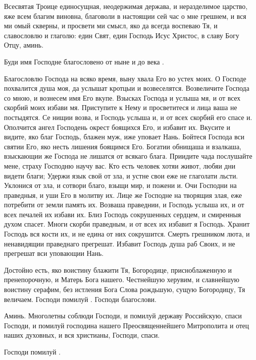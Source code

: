\begin{mymulticols}
 Всесвятая Троице единосущная, неодержимая держава, и неразделимое царство, яже всем благим виновна, благоволи в настоящии сей час о мне грешнем, и вся ми омый скверны, и просвети ми смысл, яко да всегда воспеваю Тя, и славословлю и глаголю: един Свят, един Господь Исус Христос, в славу Богу Отцу, аминь. 

Буди имя Господне благословено от ныне и до века . 





Благословлю Господа на всяко время, выну хвала Его во устех моих. О Господе похвалится душа моя, да услышат кротцыи и возвеселятся. Возвеличите Господа со мною, и вознесем имя Его вкупе. Взысках Господа и услыша мя, и от всех скорбий моих избави мя. Приступите к Нему и просветитеся и лица ваша не постыдятся. Се нищии возва, и Господь услыша и, и от всех скорбий его спасе и. Ополчится ангел Господень окрест боящихся Его, и избавит их. Вкусите и видите, яко благ Господь, блажен муж, иже уповает Нань. Бойтеся Господа вси святии Его, яко несть лишения боящимся Его. Богатии обнищаша и взалкаша, взыскающии же Господа не лишатся от всякаго блага. Приидите чада послушайте мене, страху Господню научу вас. Кто есть человек хотяи живот, любяи дни видети благи; Удержи язык свой от зла, и устне свои еже не глаголати льсти. Уклонися от зла, и сотвори благо, взыщи мир, и пожени и. Очи Господни на праведныя, и уши Его в молитву их. Лице же Господне на творящия злая, еже потребити от земли память их. Возваша праведнии, и Господь услыша их, и от всех печалей их избави их. Близ Господь сокрушенных сердцем, и смиренныя духом спасет. Многи скорби праведным, и от всех их избавит я Господь. Хранит Господь вся кости их, и не едина от них сокрушится. Смерть грешником люта, и ненавидящии праведнаго прегрешат. Избавит Господь душа раб Своих, и не прегрешат вси уповающии Нань. 

Достойно есть, яко воистину блажити Тя, Богородице, присноблаженную и пренепорочную, и Матерь Бога нашего. Честнейшую херувим, и славнейшую воистину серафим, без истления Бога Слова рождьшую, сущую Богородицу, Тя величаем.   Господи помилуй . Господи благослови.  


 Аминь. Многолетны соблюди Господи, и помилуй державу Российскую, спаси Господи, и помилуй господина нашего Преосвященнейшего Митрополита  и отец наших духовных, и вся христианы, Господи, спаси. 

Господи помилуй .




\end{mymulticols}

